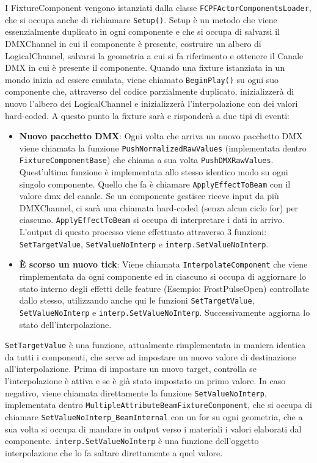 \documentclass[main.tex]{subfiles}
\begin{document}
I FixtureComponent vengono istanziati dalla classe \lstinline{FCPFActorComponentsLoader}, che si occupa anche di richiamare \lstinline{Setup()}. Setup è un metodo che viene essenzialmente duplicato in ogni componente e che si occupa di salvarsi il DMXChannel in cui il componente è presente, costruire un albero di LogicalChannel, salvarsi la geometria a cui si fa riferimento e ottenere il Canale DMX in cui è presente il componente. Quando una fixture istanziata in un mondo inizia ad essere emulata, viene chiamato \lstinline{BeginPlay()} su ogni suo componente che, attraverso del codice parzialmente duplicato, inizializzerà di nuovo l'albero dei LogicalChannel e inizializzerà l'interpolazione con dei valori hard-coded. A questo punto la fixture sarà  e risponderà a due tipi di eventi:
\begin{itemize}
    \item \textbf{Nuovo pacchetto DMX}: Ogni volta che arriva un nuovo pacchetto DMX viene chiamata la funzione \lstinline{PushNormalizedRawValues} (implementata dentro \lstinline{FixtureComponentBase}) che chiama a sua volta \lstinline{PushDMXRawValues}. Quest'ultima funzione è implementata allo stesso identico modo su ogni singolo componente. Quello che fa è chiamare \lstinline{ApplyEffectToBeam} con il valore dmx del canale. Se un componente gestisce riceve input da più DMXChannel, ci sarà una chiamata hard-coded (senza alcun ciclo for) per ciascuno. \lstinline{ApplyEffectToBeam} si occupa di interpretare i dati in arrivo. L'output di questo processo viene effettuato attraverso 3 funzioni: \lstinline{SetTargetValue}, \lstinline{SetValueNoInterp} e \lstinline{interp.SetValueNoInterp}.
    \item \textbf{È scorso un nuovo tick}: Viene chiamata \lstinline{InterpolateComponent} che viene rimplementata da ogni componente ed in ciascuno si occupa di aggiornare lo stato interno degli effetti delle feature (Esempio: FrostPulseOpen) controllate dallo stesso, utilizzando anche qui le funzioni \lstinline{SetTargetValue}, \lstinline{SetValueNoInterp} e \lstinline{interp.SetValueNoInterp}. Successivamente aggiorna lo stato dell'interpolazione.
\end{itemize}
\lstinline{SetTargetValue} è una funzione, attualmente rimplementata in maniera identica da tutti i componenti, che serve ad impostare un nuovo valore di destinazione all'interpolazione. Prima di impostare un nuovo target, controlla se l'interpolazione è attiva e se è già stato impostato un primo valore. In caso negativo, viene chiamata direttamente la funzione \lstinline{SetValueNoInterp}, implementata dentro \lstinline{MultipleAttributeBeamFixtureComponent}, che si occupa di chiamare \lstinline{SetValueNoInterp_BeamInternal} con un for su ogni geometria, che a sua volta si occupa di mandare in output verso i materiali i valori elaborati dal componente.
\lstinline{interp.SetValueNoInterp} è una funzione dell'oggetto interpolazione che lo fa saltare direttamente a quel valore.
\end{document}
